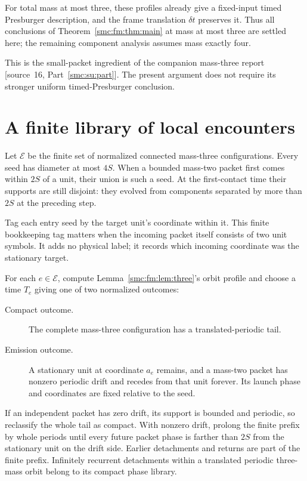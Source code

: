 \documentclass[11pt,letterpaper]{article}
\numberwithin{equation}{section}
\theoremstyle{definition}
\theoremstyle{remark}
\begin{document}
For total mass at most three, these profiles already give a fixed-input
timed Presburger description, and the frame translation $\delta t$ preserves
it. Thus all conclusions of Theorem~\ref{smc:fm:thm:main} at mass at most three
are settled here; the remaining component analysis assumes mass exactly four.

This is the small-packet ingredient of the companion mass-three
report \textup{[source~16, Part~\ref{smc:su:part}]}. The present argument does not require its stronger
uniform timed-Presburger conclusion.

\section{A finite library of local encounters}\label{smc:fm:sec:library}
Let $\mathcal E$ be the finite set of normalized connected mass-three
configurations. Every seed has diameter at most $4S$. When a bounded mass-two
packet first comes within $2S$ of a unit, their union is such a seed. At the
first-contact time their supports are still disjoint: they evolved from
components separated by more than $2S$ at the preceding step.

Tag each entry seed by the target unit's coordinate within it. This finite
bookkeeping tag matters when the incoming packet itself consists of two unit
symbols. It adds no physical label; it records which incoming coordinate was
the stationary target.

For each $e\in\mathcal E$, compute Lemma~\ref{smc:fm:lem:three}'s orbit profile and
choose a time $T_e$ giving one of two normalized outcomes:
\begin{description}
\item[Compact outcome.] The complete mass-three configuration has a
translated-periodic tail.
\item[Emission outcome.] A stationary unit at coordinate $a_e$ remains,
and a mass-two packet has nonzero periodic drift and recedes from that unit
forever. Its launch phase and coordinates are fixed relative to the seed.
\end{description}
If an independent packet has zero drift, its support is bounded and periodic,
so reclassify the whole tail as compact. With nonzero drift, prolong the finite
prefix by whole periods until every future packet phase is farther than $2S$
from the stationary unit on the drift side. Earlier detachments and returns are
part of the finite prefix. Infinitely recurrent detachments within a translated
periodic three-mass orbit belong to its compact phase library.
\end{document}
